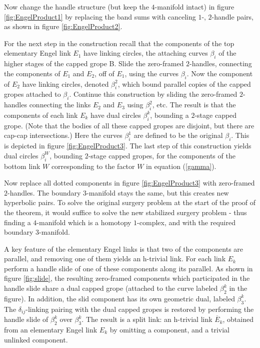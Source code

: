 \documentclass[12pt]{amsart}
\theoremstyle{definition}
\theoremstyle{remark}
\numberwithin{equation}{section}
\theoremstyle{plain}
\theoremstyle{definition}
\numberwithin{figure}{section}
\begin{document}
Now change the handle structure (but keep the $4$-manifold intact)  in figure \ref{fig:EngelProduct1} by replacing the band sums with canceling $1$-, $2$-handle pairs, as shown in figure \ref{fig:EngelProduct2}. 


For the next step in the construction recall that the components of the top elementary Engel link $E_1$ have linking circles, 
the attaching curves ${\beta}_i$  of the higher stages of the capped grope B. Slide the zero-framed $2$-handles, connecting the components of $E_1$ and $E_2$, off of $E_1$, using the curves ${\beta}_i$. Now the component of $E_2$ have linking circles, denoted ${\beta}^2_i$, which bound  parallel copies of the capped gropes attached to ${\beta}_i$.  Continue this construction by sliding the zero-framed $2$-handles connecting the links $E_2$ and $E_3$ using ${\beta}^2_i$, etc. The result is that the components of each link $E_k$ have dual circles ${\beta}^k_i$, bounding a $2$-stage capped grope. (Note that the bodies of all these capped gropes are disjoint, but there are cap-cap intersections.) Here the curves ${\beta}^1_i$ are defined to be the original ${\beta}_i$. This is depicted in figure \ref{fig:EngelProduct3}. The last step of this construction yields dual circles ${\beta}^W_i$, bounding $2$-stage capped gropes, for the components of the bottom link $W$ corresponding to the factor $W$ in equation (\ref{gamma}).




Now replace all dotted components  in figure \ref{fig:EngelProduct3} with zero-framed $2$-handles. The boundary $3$-manifold stays the same, but this creates new hyperbolic pairs. To solve the original surgery problem at the start of the proof of the theorem, it would suffice to solve the new stabilized surgery problem - thus finding a $4$-manifold which is a homotopy $1$-complex, and with the required boundary $3$-manifold. 

A key feature of the elementary Engel links is that two of the components are parallel, and removing one of them yields an h-trivial link. For each link $E_k$ perform a handle slide of one of these components along its parallel. As shown in figure \ref{fig:slide}, the resulting zero-framed components which participated in the handle slide share a dual capped grope (attached to the curve labeled ${\beta}_2^k$ in the figure). In addition, the slid component has its own geometric dual, labeled ${\beta}_3^k$. The ${\delta}_{ij}$-linking  pairing with the dual capped gropes is restored by performing the handle slide of ${\beta}_2^k$ over ${\beta}_3^k$.
The result is a split link: an h-trivial link $\overline E_k$, obtained from an elementary Engel link $E_k$ by omitting a component, and a trivial unlinked component. 
\end{document}
